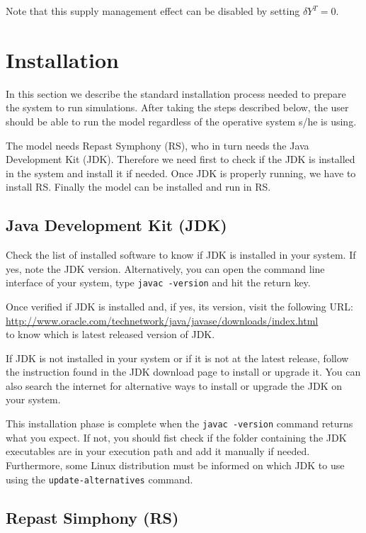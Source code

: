 \documentclass{article}
\begin{document}
Note that this supply management effect can be disabled by setting $\delta Y^T=0$.

\section{Installation}

In this section we describe the standard installation process needed to prepare the system to run simulations. After taking the steps described below, the user should be able to run the model regardless of the operative system s/he is using.

The model needs Repast Symphony (RS), who in turn needs the Java Development Kit (JDK). Therefore we need first to check if the JDK is installed in the system and install it if needed. Once JDK is properly running, we have to install RS. Finally the model can be installed and run in RS.

\subsection{Java Development Kit (JDK)}

Check the list of installed software to know if JDK is installed in your system. If yes, note the JDK version.
Alternatively, you can open the command line interface of your system, type \verb+javac -version+ and hit the return key. 

Once verified if JDK is installed and, if yes, its version, visit the following URL:\\
\url{http://www.oracle.com/technetwork/java/javase/downloads/index.html}\\
to know which is latest released version of JDK.

If JDK is not installed in your system or if it is not at the latest release, follow the instruction found in the JDK download page to install or upgrade it. You can also search the internet for alternative ways to install or upgrade the JDK on your system.

This installation phase is complete when the \verb+javac -version+ command returns what you expect.
If not, you should fist check if the folder containing the JDK executables are in your execution path and add it manually if needed.
Furthermore, some Linux distribution must be informed on which JDK to use using the \verb+update-alternatives+ command. 

\subsection{Repast Simphony (RS)}
\end{document}
